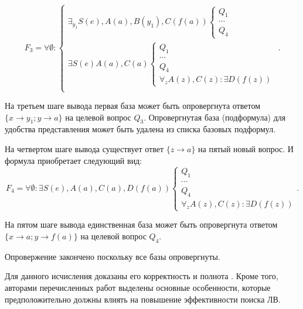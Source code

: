 \begin{example}
\begin{equation*}\label{ex:f3}
F_3 =
\forall\emptyset\colon
\left\lbrace
\begin{array}{l}
	\exists_{y_1} S(e),A(a),B(y_1),C(f(a))
	\left\lbrace
	\begin{array}{l}
		Q_1 \\ \cdots \\ Q_4
	\end{array}\right. \\
	\exists S(e)A(a),C(a)
	\left\lbrace
	\begin{array}{l}
		Q_1 \\ \cdots \\ Q_4 \\
		\forall_z A(z),C(z)\colon \exists D(f(z))
	\end{array}\right. \\
\end{array}\right..
\end{equation*}

На третьем шаге вывода первая база может быть опровергнута ответом $\{x \rightarrow y_1; y \rightarrow a\}$ на целевой вопрос $Q_3$. Опровергнутая база (подформула) для удобства представления может быть удалена из списка базовых подформул.

На четвертом шаге вывода существует ответ $\{z \rightarrow a\}$ на пятый новый вопрос. И формула приобретает следующий вид:
\begin{equation*}\label{ex:f5}
	F_4 = \forall\emptyset\colon \exists S(e),A(a), C(a),D(f(a))
	\left\lbrace
	\begin{array}{l}
		Q_1 \\ \cdots \\ Q_4 \\
		\forall_z A(z),C(z)\colon \exists D(f(z))
	\end{array}\right..
\end{equation*}

На пятом шаге вывода единственная база может быть опровергнута ответом $\{x \rightarrow a; y \rightarrow f(a)\}$ на целевой вопрос $Q_4$.

Опровержение закончено поскольку все базы опровергнуты.

\end{example}

Для данного исчисления доказаны его корректность и полнота \cite{ICDS2000, DavydovX}. Кроме того, авторами перечисленных работ выделены основные особенности, которые предположительно должны влиять на повышение эффективности поиска ЛВ.

